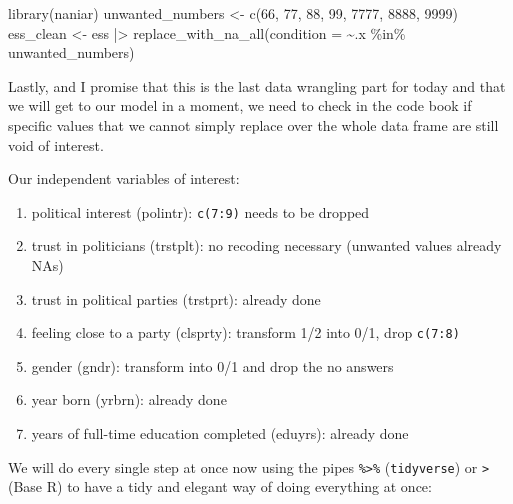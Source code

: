 \documentclass[
  letterpaper,
  DIV=11,
  numbers=noendperiod]{scrreprt}
\newenvironment{Shaded}{\begin{snugshade}}{\end{snugshade}}
\newcommand{\AttributeTok}[1]{\textcolor[rgb]{0.40,0.45,0.13}{#1}}
\newcommand{\DecValTok}[1]{\textcolor[rgb]{0.68,0.00,0.00}{#1}}
\newcommand{\FunctionTok}[1]{\textcolor[rgb]{0.28,0.35,0.67}{#1}}
\newcommand{\NormalTok}[1]{\textcolor[rgb]{0.00,0.23,0.31}{#1}}
\newcommand{\OtherTok}[1]{\textcolor[rgb]{0.00,0.23,0.31}{#1}}
\newcommand{\SpecialCharTok}[1]{\textcolor[rgb]{0.37,0.37,0.37}{#1}}
\providecommand{\tightlist}{%
  \setlength{\itemsep}{0pt}\setlength{\parskip}{0pt}}\usepackage{longtable,booktabs,array}
\begin{document}
\begin{Shaded}
\begin{Highlighting}[]
\FunctionTok{library}\NormalTok{(naniar)}
\NormalTok{unwanted\_numbers }\OtherTok{\textless{}{-}} \FunctionTok{c}\NormalTok{(}\DecValTok{66}\NormalTok{, }\DecValTok{77}\NormalTok{, }\DecValTok{88}\NormalTok{, }\DecValTok{99}\NormalTok{, }\DecValTok{7777}\NormalTok{, }\DecValTok{8888}\NormalTok{, }\DecValTok{9999}\NormalTok{)}
\NormalTok{ess\_clean }\OtherTok{\textless{}{-}}\NormalTok{ ess }\SpecialCharTok{|\textgreater{}} 
  \FunctionTok{replace\_with\_na\_all}\NormalTok{(}\AttributeTok{condition =} \SpecialCharTok{\textasciitilde{}}\NormalTok{.x }\SpecialCharTok{\%in\%}\NormalTok{ unwanted\_numbers)}
\end{Highlighting}
\end{Shaded}

Lastly, and I promise that this is the last data wrangling part for
today and that we will get to our model in a moment, we need to check in
the code book if specific values that we cannot simply replace over the
whole data frame are still void of interest.

Our independent variables of interest:

\begin{enumerate}
\def\labelenumi{\arabic{enumi}.}
\tightlist
\item
  political interest (polintr): \texttt{c(7:9)} needs to be dropped
\item
  trust in politicians (trstplt): no recoding necessary (unwanted values
  already NAs)
\item
  trust in political parties (trstprt): already done
\item
  feeling close to a party (clsprty): transform 1/2 into 0/1, drop
  \texttt{c(7:8)}
\item
  gender (gndr): transform into 0/1 and drop the no answers
\item
  year born (yrbrn): already done
\item
  years of full-time education completed (eduyrs): already done
\end{enumerate}

We will do every single step at once now using the pipes
\texttt{\%\textgreater{}\%} (\texttt{tidyverse}) or
\texttt{\textbar{}\textgreater{}} (Base R) to have a tidy and elegant
way of doing everything at once:
\end{document}
